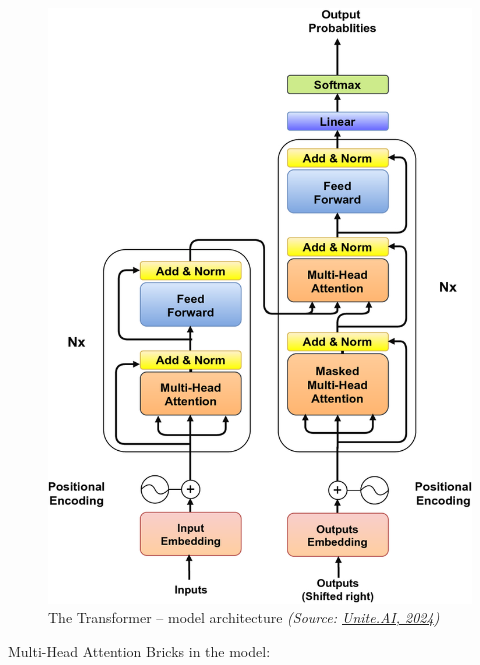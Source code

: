 
\begin{figure}[H]
\centering
\includegraphics [scale=1.7]{img/Graphics/Transformer.png}
\caption[The Transformer – model architecture]{ The Transformer – model architecture \textit{(Source: \href{https://www.unite.ai/generative-ai-the-idea-behind-chatgpt-dall-e-midjourney-and-more/}{Unite.AI, 2024})}}

\end{figure}

\newpage
Multi-Head Attention Bricks in the model:

